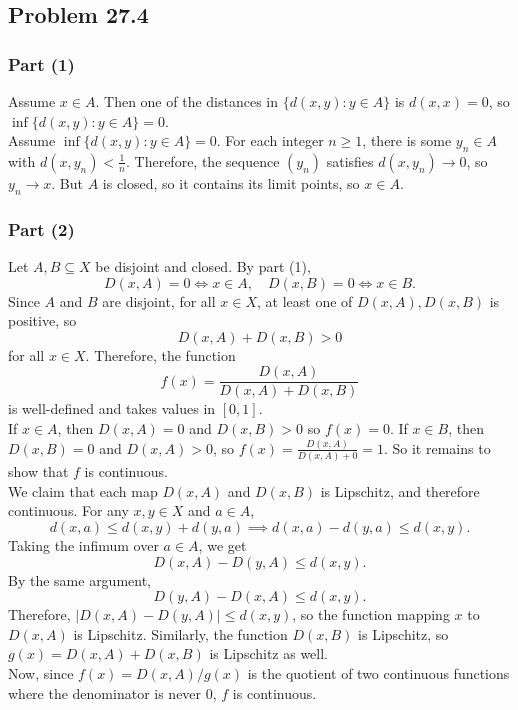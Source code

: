 \documentclass{article}
\begin{document}
\subsection*{Problem 27.4}
\subsubsection*{Part (1)}
Assume $x \in A$. Then one of the distances in $\{d(x, y): y \in A\}$ is $d(x, x) = 0$, so $\inf\{d(x, y): y \in A\} = 0$. \\

Assume $\inf\{d(x, y): y \in A\} = 0$. For each integer $n \ge 1$, there is some $y_n \in A$ with $d(x, y_n) < \frac{1}{n}$. Therefore, the sequence $(y_n)$ satisfies $d(x, y_n) \to 0$, so $y_n \to x$. But $A$ is closed, so it contains its limit points, so $x \in A$.

\subsubsection*{Part (2)}
Let $A, B \subseteq X$ be disjoint and closed. By part (1),
$$D(x, A) = 0 \iff x \in A, \quad D(x, B) = 0 \iff x \in B.$$
Since $A$ and $B$ are disjoint, for all $x \in X$, at least one of $D(x, A), D(x, B)$ is positive, so
$$D(x, A) + D(x, B) > 0$$
for all $x \in X$. Therefore, the function
$$f(x) = \frac{D(x, A)}{D(x, A) + D(x, B)}$$
is well-defined and takes values in $[0, 1]$. \\

If $x \in A$, then $D(x, A) = 0$ and $D(x, B) > 0$ so $f(x) = 0$. If $x \in B$, then $D(x, B) = 0$ and $D(x, A) > 0$, so $f(x) = \frac{D(x, A)}{D(x, A) + 0} = 1$. So it remains to show that $f$ is continuous. \\

We claim that each map $D(x, A)$ and $D(x, B)$ is Lipschitz, and therefore continuous. For any $x, y \in X$ and $a \in A$,
$$d(x, a) \le d(x, y) + d(y, a) \implies d(x, a) - d(y, a) \le d(x, y).$$
Taking the infimum over $a \in A$, we get
$$D(x, A) - D(y, A) \le d(x, y).$$
By the same argument,
$$D(y, A) - D(x, A) \le d(x, y).$$
Therefore, $|D(x, A) - D(y, A)| \le d(x, y)$, so the function mapping $x$ to $D(x, A)$ is Lipschitz. Similarly, the function $D(x, B)$ is Lipschitz, so $g(x) = D(x, A) + D(x, B)$ is Lipschitz as well. \\

Now, since $f(x) = D(x, A)/g(x)$ is the quotient of two continuous functions where the denominator is never $0$, $f$ is continuous.
\end{document}
